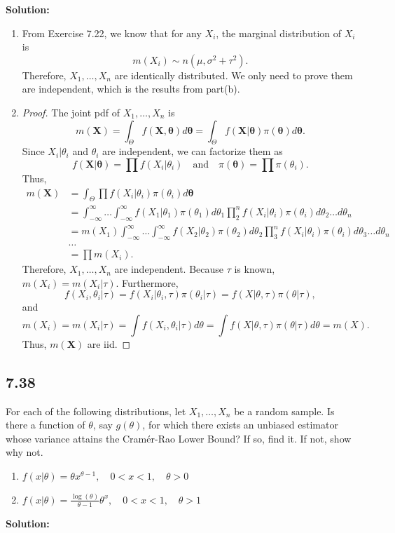 \documentclass[11pt]{article}
\newcommand{\X}{\mathbf{X}}
\newcommand{\Sol}{\par {\bf Solution:}}
\newcommand{\sample}[1]{#1_1 , \dots , #1_n}
\begin{document}
\Sol
\begin{enumerate}[label=(\alph*)]
    \item
    From Exercise 7.22, we know that for any $X_i$, the marginal distribution of $X_i$ is 
    \[
    m(X_i) \sim n(\mu, \sigma^2 + \tau^2).
    \]
    Therefore, $\sample{X}$ are identically distributed.
    We only need to prove them are independent, which is the results from part(b).
    \item
    \begin{proof}
    The joint pdf of $\sample{X}$ is
    \[
    m(\X) = \int_{\Theta}f(\X, \boldsymbol \theta) d \boldsymbol \theta = \int_{\Theta} f(\X | \boldsymbol \theta) \pi(\boldsymbol \theta) d \boldsymbol \theta.
    \]
    Since $X_i|\theta_i$ and $\theta_i$ are independent, we can factorize them as
    \[
    f(\X | \boldsymbol \theta) = \prod f(X_i|\theta_i) \quad \text{and} \quad
    \pi(\boldsymbol \theta) = \prod \pi(\theta_i).
    \]
    Thus,
    \begin{align*}
        m(\X) &= \int_{\Theta} \prod f(X_i|\theta_i)\pi(\theta_i) d \boldsymbol \theta \\
        &= \int_{-\infty}^\infty \dots \int_{-\infty}^\infty f(X_1|\theta_1)\pi(\theta_1) d\theta_1 \prod_2^n f(X_i|\theta_i)\pi(\theta_i) d \theta_2 \dots d\theta_n \\
        & = m(X_1) \int_{-\infty}^\infty \dots \int_{-\infty}^\infty f(X_2|\theta_2)\pi(\theta_2) d\theta_2 \prod_3^n f(X_i|\theta_i)\pi(\theta_i) d \theta_3 \dots d\theta_n \\
        &\dots \\
        &= \prod m(X_i).
    \end{align*}
    Therefore, $\sample{X}$ are independent.
    Because $\tau$ is known, $m(X_i) = m(X_i|\tau)$. Furthermore,
    \[
    f(X_i, \theta_i|\tau) = f(X_i | \theta_i, \tau) \pi (\theta_i|\tau) = f(X | \theta, \tau) \pi (\theta|\tau),
    \]
    and 
    \[
    m(X_i) = m(X_i|\tau) = \int f(X_i, \theta_i|\tau) d\theta = \int  f(X | \theta, \tau) \pi (\theta|\tau)d\theta = m(X).
    \]
    Thus, $m(\X)$ are iid.
    \end{proof}
\end{enumerate}


\subsection*{7.38}
For each of the following distributions, let $\sample{X}$ be a random sample. Is there a function of $\theta$, say $g(\theta)$, for which there exists an unbiased estimator whose variance
attains the Cram\'{e}r-Rao Lower Bound? If so, find it. If not, show why not.
\begin{enumerate}[label=(\alph*)]
    \item
    $
    f(x|\theta) = \theta x^{\theta-1}, \quad 0 < x < 1, \quad \theta > 0
    $
    \item
    
    $f(x|\theta) = \frac{\log (\theta)}{\theta - 1}\theta^x, \quad 0 < x < 1, \quad \theta > 1$
   
\end{enumerate}
\Sol
\end{document}
